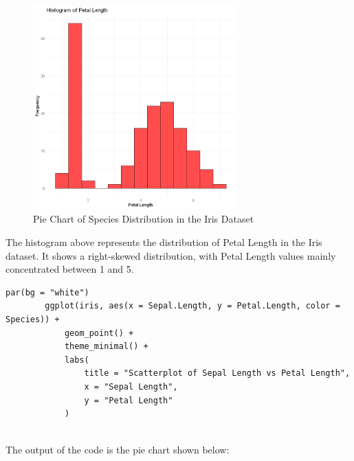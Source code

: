 \documentclass[a4paper,12pt]{article}
\begin{document}
    \begin{figure}[h]
        \includegraphics[width=0.7\textwidth]{04.png}
        \caption{Pie Chart of Species Distribution in the Iris Dataset}
        \label{fig:pie_chart}
    \end{figure}
    The histogram above represents the distribution of Petal Length in the Iris dataset. It shows a right-skewed distribution, with Petal Length values mainly concentrated between 1 and 5.

    \newpage

    \begin{lstlisting}[style=RStyle]
        par(bg = "white")
        ggplot(iris, aes(x = Sepal.Length, y = Petal.Length, color = Species)) +
            geom_point() +
            theme_minimal() +
            labs(
                title = "Scatterplot of Sepal Length vs Petal Length",
                x = "Sepal Length", 
                y = "Petal Length"
            )
        
    \end{lstlisting}
        
    The output of the code is the pie chart shown below:
    
\end{document}
